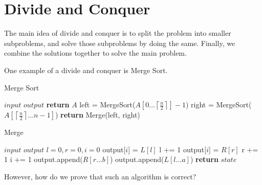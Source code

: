 
\section{Divide and Conquer}

The main idea of divide and conquer is to split the problem into smaller subproblems, and solve those subproblems by doing the same. Finally, we combine the solutions together to solve the main problem.

\begin{eg}
	One example of a divide and conquer is Merge Sort.
\end{eg}

\begin{algorithm}
	\algrenewcommand{}
	\algrenewcommand{}
	\caption{Merge Sort}\label{alg:merge-sort}
	\begin{algorithmic}[1]
		\Require $input$
		\Ensure $output$
			\State \textbf{return} \( A \)
		\EndIf
		\State left = MergeSort(\( A[0\ldots \left\lceil \frac{n}{2} \right\rceil ] -1\))
		\State right = MergeSort(\( A[\left\lceil \frac{n}{2} \right\rceil \ldots n-1] \))
		\State \textbf{return} Merge(left, right)
	\end{algorithmic}
\end{algorithm}

\begin{algorithm}
	\algrenewcommand{}
	\algrenewcommand{}
	\caption{Merge}\label{alg:merge-algo}
	\begin{algorithmic}[1]
		\Require $input$
		\Ensure $output$
		\State \( l=0, r=0, i=0 \)
				\State output[\( i \)] = \( L[l] \)
				\State l += 1 
			\Else
				\State output[\( i \)] = \( R[r] \)
				\State r += 1
			\EndIf
			\State i += 1
		\EndWhile
			\State output.append(\( R[r\ldots b] \))
		\Else
			\State output.append(\( L[l\ldots a] \))
		\EndIf
		\State \textbf{return} $state$
	\end{algorithmic}
\end{algorithm}

However, how do we prove that such an algorithm is correct?

